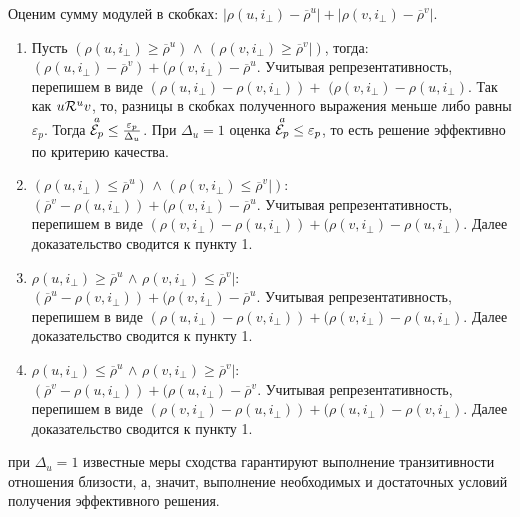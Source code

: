 Оценим сумму модулей в скобках: $|\rho(u,i_{\bot}) - \overline{\rho}^u| + |\rho(v,i_{\bot}) - \overline{\rho}^v|$.
\begin{enumerate}
	\item Пусть $(\rho(u,i_{\bot}) \ge \overline{\rho}^u)$ $\wedge$
		$(\rho(v,i_{\bot}) \ge \overline{\rho}^v|)$, тогда:\\
 $(\rho(u,i_{\bot}) - \overline{\rho}^v) +
(\rho(v,i_{\bot}) - \overline{\rho}^u$.
Учитывая репрезентативность, перепишем в виде
		$(\rho(u,i_{\bot}) - \rho(v,i_{\bot})) + $
$(\rho(v,i_{\bot}) - \rho(u,i_{\bot})$. Так как $u \mathcal{R}^u v$, то,
разницы в скобках полученного выражения меньше либо равны $\varepsilon_p$. Тогда
		${\overset{a}{\mathcal{E}_{p}}} \le \frac{\varepsilon_p}{\Delta_u}$.
		При $\Delta_u = 1$ оценка ${\overset{a}{\mathcal{E}_{p}}} \le \varepsilon_p$, то есть
		решение эффективно по критерию качества.

	\item $(\rho(u,i_{\bot}) \le \overline{\rho}^u)$ $\wedge$
		$(\rho(v,i_{\bot}) \le \overline{\rho}^v|)$:\\
 $(\overline{\rho}^v - \rho(u,i_{\bot})) + (\rho(v,i_{\bot}) - \overline{\rho}^u$. 
Учитывая репрезентативность, перепишем в виде $(\rho(v,i_{\bot}) - \rho(u,i_{\bot})) + (\rho(v,i_{\bot}) - \rho(u,i_{\bot})$. 
Далее доказательство сводится к пункту 1.

\item $\rho(u,i_{\bot}) \ge \overline{\rho}^u$ $\wedge$ $\rho(v,i_{\bot}) \le \overline{\rho}^v|$:\\
 $(\overline{\rho}^u - \rho(v,i_{\bot})) + (\rho(v,i_{\bot}) - \overline{\rho}^u$. Учитывая репрезентативность, 
перепишем в виде $(\rho(u,i_{\bot}) - \rho(v,i_{\bot})) + (\rho(v,i_{\bot}) - \rho(u,i_{\bot})$. Далее доказательство сводится к пункту 1.

\item $\rho(u,i_{\bot}) \le \overline{\rho}^u$ $\wedge$ $\rho(v,i_{\bot}) \ge \overline{\rho}^v|$:\\
 $(\overline{\rho}^v - \rho(u,i_{\bot})) + (\rho(u,i_{\bot}) - \overline{\rho}^v$. 
Учитывая репрезентативность, перепишем в виде $(\rho(v,i_{\bot}) - \rho(u,i_{\bot})) + (\rho(u,i_{\bot}) - \rho(v,i_{\bot})$. Далее доказательство сводится к пункту 1.
\end{enumerate}

		\begin{assert}
			\label{delta21}
		при $\Delta_u = 1$ известные меры сходства гарантируют
		выполнение транзитивности отношения близости, а, значит, выполнение
			необходимых и достаточных условий получения эффективного решения.
		\end{assert}

